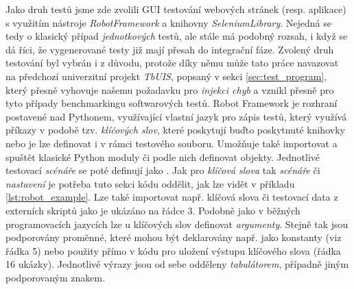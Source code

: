 \documentclass[czech, ma, kiv, he, iso690numb, pdf, viewonly]{fasthesis}
\begin{document}
        Jako druh testů jsme zde zvolili GUI testování webových stránek (resp. aplikace) s využitím nástroje \textit{RobotFramework} a knihovny \textit{SeleniumLibrary}. Nejedná se tedy o klasický případ \textit{jednotkových} testů, ale stále má podobný rozsah, i když se dá říci, že vygenerované testy již mají přesah do integrační fáze. Zvolený druh testování byl vybrán i z důvodu, protože díky němu může tato práce navazovat na předchozí univerzitní projekt \textit{TbUIS}, popsaný v sekci \ref{sec:test_program}, který přesně vyhovuje našemu požadavku pro \emph{injekci chyb} a vznikl přesně pro tyto případy \gls{benchmark}ingu softwarových testů. Robot Framework je rozhraní postavené nad Pythonem, využívající vlastní jazyk pro zápis testů, který využívá příkazy v podobě tzv. \textit{klíčových slov}, které poskytují buďto poskytnuté knihovky nebo je lze definovat i v rámci testového souboru. Umožňuje také importovat a spuštět klasické Python moduly či podle nich definovat objekty. Jednotlivé testovací \textit{scénáře} se poté definují jako . Jak pro \textit{klíčová slova} tak \textit{scénáře} či \textit{nastavení} je potřeba tuto sekci kódu oddělit, jak lze vidět v příkladu \ref{lst:robot_example}. Lze také importovat např. klíčová slova či testovací data z externích skriptů jako je ukázáno na řádce 3. Podobně jako v běžných programovacích jazycích lze u klíčových slov definovat \emph{argumenty}. Stejně tak jsou podporovány proměnné, které mohou být deklarovány např. jako konstanty (viz řádka 5) nebo použity přímo v kódu pro uložení výstupu klíčového slova (řádka 16 ukázky). Jednotlivé výrazy jsou od sebe odděleny \textit{tabulátorem}, případně jiným podporovaným znakem.
        
\end{document}

